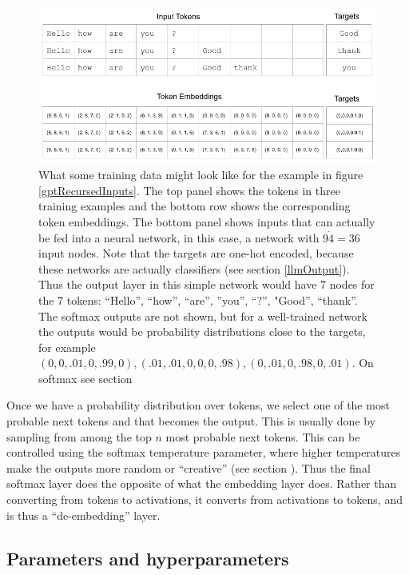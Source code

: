 \begin{figure}[h]
\centering
\includegraphics[scale=.45]{./images/contextWindow.png}
\caption[Jeff Yoshimi]{What some training data might look like for the example in figure \ref{gptRecursedInputs}. The top panel shows the tokens in three training examples and the bottom row shows the corresponding token embeddings. The bottom panel shows inputs that can actually be fed into a neural network, in this case, a network with $9 \dot 4 = 36$ input nodes. Note that the targets are one-hot encoded, because these networks are actually classifiers (see section \ref{llmOutput}). Thus the output layer in this simple network would have 7 nodes for the 7 tokens: ``Hello'', ``how'', ``are'', ''you'', ``?'', "Good'', ``thank''. The softmax outputs are not shown, but for a well-trained network the outputs would be probability distributions close to the targets, for example $(0,0,.01,0,.99,0),  (.01,.01,0,0,0,.98), (0,.01,0,.98,0,.01)$. On softmax see section }
\label{contextWindow}
\end{figure}

Once we have a probability distribution over tokens, we select one of the most probable next tokens and that becomes the output. This is usually done by sampling from among the top $n$ most probable next tokens. This can be controlled using the softmax temperature parameter, where higher temperatures make the outputs more random or ``creative'' (see section ). Thus the final softmax layer does the opposite of what the embedding layer does. Rather than converting from tokens to activations, it converts from activations to tokens, and is thus a ``de-embedding'' layer.

\subsection{Parameters and hyperparameters}

